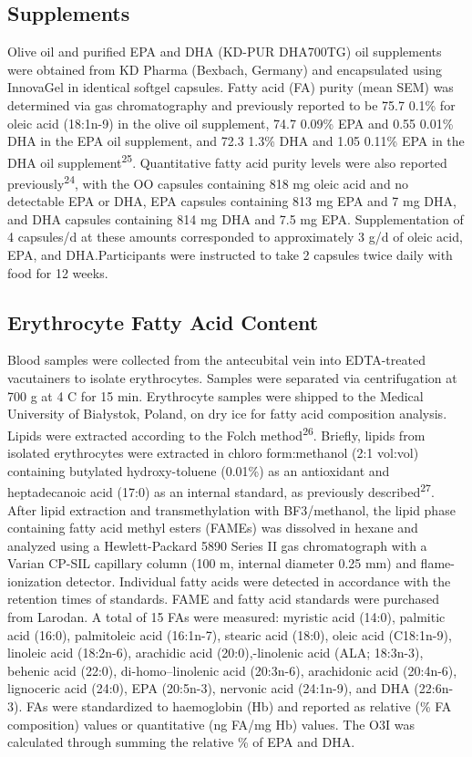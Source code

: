 \documentclass[journal=jacsat,manuscript=article]{achemso}
\begin{document}
\subsection{Supplements}\label{supplements}

Olive oil and purified EPA and DHA (KD-PUR DHA700TG) oil supplements
were obtained from KD Pharma (Bexbach, Germany) and encapsulated using
InnovaGel in identical softgel capsules. Fatty acid (FA) purity (mean
SEM) was determined via gas chromatography and previously reported to be
75.7 0.1\% for oleic acid (18:1n-9) in the olive oil supplement, 74.7
0.09\% EPA and 0.55 0.01\% DHA in the EPA oil supplement, and 72.3 1.3\%
DHA and 1.05 0.11\% EPA in the DHA oil supplement\textsuperscript{25}.
Quantitative fatty acid purity levels were also reported
previously\textsuperscript{24}, with the OO capsules containing 818 mg
oleic acid and no detectable EPA or DHA, EPA capsules containing 813 mg
EPA and 7 mg DHA, and DHA capsules containing 814 mg DHA and 7.5 mg EPA.
Supplementation of 4 capsules/d at these amounts corresponded to
approximately 3 g/d of oleic acid, EPA, and DHA.Participants were
instructed to take 2 capsules twice daily with food for 12 weeks.

\subsection{Erythrocyte Fatty Acid
Content}\label{erythrocyte-fatty-acid-content}

Blood samples were collected from the antecubital vein into EDTA-treated
vacutainers to isolate erythrocytes. Samples were separated via
centrifugation at 700 g at 4 C for 15 min. Erythrocyte samples were
shipped to the Medical University of Białystok, Poland, on dry ice for
fatty acid composition analysis. Lipids were extracted according to the
Folch method\textsuperscript{26}. Briefly, lipids from isolated
erythrocytes were extracted in chloro form:methanol (2:1 vol:vol)
containing butylated hydroxy-toluene (0.01\%) as an antioxidant and
heptadecanoic acid (17:0) as an internal standard, as previously
described\textsuperscript{27}. After lipid extraction and
transmethylation with BF3/methanol, the lipid phase containing fatty
acid methyl esters (FAMEs) was dissolved in hexane and analyzed using a
Hewlett-Packard 5890 Series II gas chromatograph with a Varian CP-SIL
capillary column (100 m, internal diameter 0.25 mm) and flame-ionization
detector. Individual fatty acids were detected in accordance with the
retention times of standards. FAME and fatty acid standards were
purchased from Larodan. A total of 15 FAs were measured: myristic acid
(14:0), palmitic acid (16:0), palmitoleic acid (16:1n-7), stearic acid
(18:0), oleic acid (C18:1n-9), linoleic acid (18:2n-6), arachidic acid
(20:0),-linolenic acid (ALA; 18:3n-3), behenic acid (22:0),
di-homo--linolenic acid (20:3n-6), arachidonic acid (20:4n-6),
lignoceric acid (24:0), EPA (20:5n-3), nervonic acid (24:1n-9), and DHA
(22:6n-3). FAs were standardized to haemoglobin (Hb) and reported as
relative (\% FA composition) values or quantitative (ng FA/mg Hb)
values. The O3I was calculated through summing the relative \% of EPA
and DHA.
\end{document}
